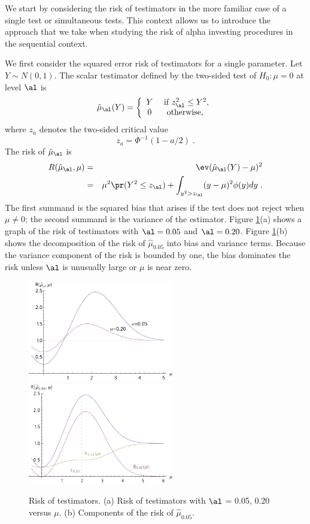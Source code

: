 \documentclass[12pt]{article}
\begin{document}
 We start by considering the risk of testimators in the more familiar case of a
 single test or simultaneous tests.  This context allows us to introduce the
 approach that we take when studying the risk of alpha investing procedures in
 the sequential context.


 We first consider the squared error risk of testimators for a single parameter.
  Let $Y \sim N(0,1)$.  The scalar testimator defined by the two-sided test of
 $H_0: \mu=0$ at level $\al$ is
 \begin{equation}
   \hat\mu_\al(Y) = \left\{
     \begin{array}{cc}
        Y & \mbox{ if } z_\al^2 \le Y^2, \cr
        0 & \mbox{ otherwise, }
      \end{array} \right.
 \label{eq:muHat}
 \end{equation}
 where $z_{a}$ denotes the two-sided critical value 
 \begin{equation}
   z_{a} = \Phi^{-1}(1-a/2) \;.
 \label{eq:zAlpha}
 \end{equation}
 The risk of $\hat\mu_\al$ is
 \begin{eqnarray}
   R(\hat\mu_\al, \mu) 
     &=& \ev(\hat\mu_\al(Y) - \mu)^2  \cr
     &=& \mu^2 \pr(Y^2 \le z_\al) 
         + \int_{y^2>z_\al} (y-\mu)^2 \phi(y) dy \;.
 \label{eq:risk_mu_al}
 \end{eqnarray}
 The first summand is the squared bias that arises if the test does not reject
 when $\mu \ne 0$; the second summand is the variance of the estimator.  Figure
 \ref{fig:risk}(a) shows a graph of the risk of testimators with $\al=0.05$
 and $\al = 0.20$.  Figure \ref{fig:risk}(b) shows the decomposition of the risk
 of $\hat\mu_{0.05}$ into bias and variance terms.  Because the variance
 component of the risk is bounded by one, the bias dominates the risk unless
 $\al$ is unusually large or $\mu$ is near zero.


 \begin{figure}
 \caption{ \label{fig:risk} Risk of testimators. (a) Risk of testimators with
$\al$ = 0.05, 0.20 versus $\mu$. (b) Components of the risk of $\hat\mu_{0.05}$. }
 \centerline{ 
   \includegraphics[width=2.5in]{figures/risk_a}
   \includegraphics[width=2.5in]{figures/risk_b} }
 \end{figure}
\end{document}
